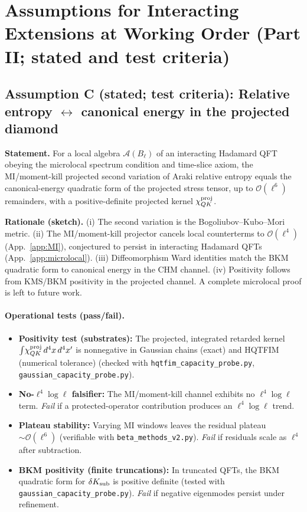 \documentclass[aps,prd,onecolumn,superscriptaddress,nofootinbib]{revtex4-2}
\begin{document}
\section{Assumptions for Interacting Extensions at Working Order (Part II; stated and test criteria)}
\label{sec:proofs}

\subsection{Assumption C (stated; test criteria): Relative entropy \texorpdfstring{$\leftrightarrow$}{<->} canonical energy in the projected diamond}
\label{sec:lemmaC}

\noindent\textbf{Statement.} For a local algebra \(\mathcal A(B_\ell)\) of an interacting Hadamard QFT obeying the microlocal spectrum condition and time-slice axiom, the MI/moment-kill projected second variation of Araki relative entropy equals the canonical-energy quadratic form of the projected stress tensor, up to \(\mathcal O(\ell^6)\) remainders, with a positive-definite projected kernel \(\chi_{QK}^{\rm proj}\).

\smallskip
\noindent\textbf{Rationale (sketch).} (i) The second variation is the Bogoliubov--Kubo--Mori metric. (ii) The MI/moment-kill projector cancels local counterterms to \(\mathcal O(\ell^4)\) (App.~\ref{app:MI}), conjectured to persist in interacting Hadamard QFTs (App.~\ref{app:microlocal}). (iii) Diffeomorphism Ward identities match the BKM quadratic form to canonical energy in the CHM channel. (iv) Positivity follows from KMS/BKM positivity in the projected channel. A complete microlocal proof is left to future work.

\paragraph{Operational tests (pass/fail).}
\begin{itemize}[leftmargin=*,noitemsep,topsep=0pt]
\item \textbf{Positivity test (substrates):} The projected, integrated retarded kernel $\int\!\chi^{\rm proj}_{QK}\,d^4x\,d^4x'$ is nonnegative in Gaussian chains (exact) and HQTFIM (numerical tolerance) (checked with \texttt{hqtfim\_capacity\_probe.py}, \texttt{gaussian\_capacity\_probe.py}).
\item \textbf{No-$\ell^4\log\ell$ falsifier:} The MI/moment-kill channel exhibits no $\ell^4\log\ell$ term. \emph{Fail} if a protected-operator contribution produces an $\ell^4\log\ell$ trend.
\item \textbf{Plateau stability:} Varying MI windows leaves the residual plateau $\sim\mathcal O(\ell^6)$ (verifiable with \texttt{beta\_methods\_v2.py}). \emph{Fail} if residuals scale as $\ell^4$ after subtraction.
\item \textbf{BKM positivity (finite truncations):} In truncated QFTs, the BKM quadratic form for $\delta K_{\rm sub}$ is positive definite (tested with \texttt{gaussian\_capacity\_probe.py}). \emph{Fail} if negative eigenmodes persist under refinement.
\end{itemize}
\end{document}
